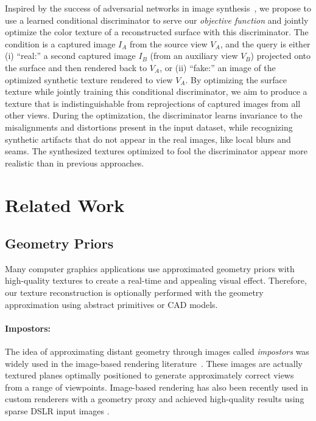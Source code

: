 Inspired by the success of adversarial networks in image synthesis~\cite{goodfellow2014generative}, we propose to use a learned conditional discriminator to serve our {\em objective function} and jointly optimize the color texture of a reconstructed surface with this discriminator.
The condition is a captured image $I_A$ from the source view $V_A$, and the query is either (i) ``real:'' a second captured image $I_B$ (from an auxiliary view $V_B$) projected onto the surface and then rendered back to $V_A$, or (ii) ``fake:'' an image of the optimized synthetic texture rendered to view $V_A$. By optimizing the surface texture while jointly training this conditional discriminator, we aim to produce a texture that is indistinguishable from reprojections of captured images from all other views.  
%
During the optimization, the discriminator learns invariance to the misalignments and distortions present in the input dataset, while recognizing synthetic artifacts that do not appear in the real images, like local blurs and seams.  The synthesized textures optimized to fool the discriminator appear more realistic than in previous approaches.

\section{Related Work}
\label{related:texture-recon}

\subsection{Geometry Priors}
Many computer graphics applications use approximated geometry priors with high-quality textures to create a real-time and appealing visual effect. Therefore, our texture reconstruction is optionally performed with the geometry approximation using abstract primitives or CAD models.

\paragraph*{Impostors:} The idea of approximating distant geometry through images called {\em impostors} was widely used in the image-based rendering literature~\cite{sillion1997efficient,decoret1999multi}. 
These images are actually textured planes optimally positioned to generate approximately correct views from a range of viewpoints.
Image-based rendering has also been recently used in custom renderers with a geometry proxy and achieved high-quality results using sparse DSLR input images \cite{hedman2016scalable}.

